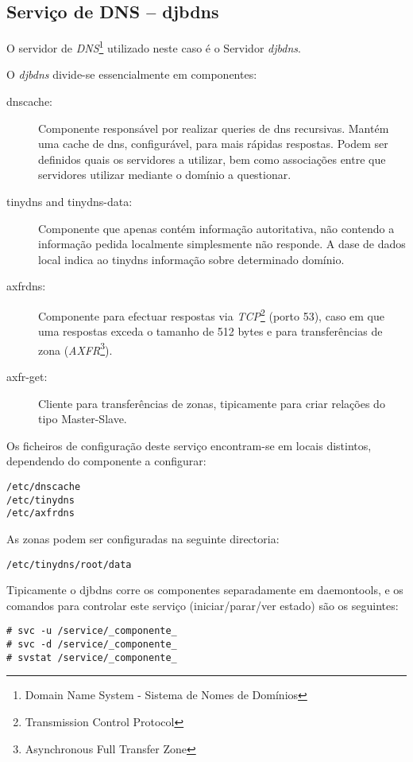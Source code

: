 \subsection{Serviço de DNS -- djbdns}

O servidor de \emph{DNS}\footnote{Domain Name System - Sistema de Nomes de Domínios} utilizado neste caso é o Servidor \emph{djbdns}.

O \emph{djbdns} divide-se essencialmente em componentes:
\begin{description}
	\item[dnscache:] Componente responsável por realizar queries de dns recursivas. Mantém uma cache de dns, configurável, para mais rápidas respostas. Podem ser definidos quais os servidores a utilizar, bem como associações entre que servidores utilizar mediante o domínio a questionar.
	\item[tinydns and tinydns-data:] Componente que apenas contém informação autoritativa, não contendo a informação pedida localmente simplesmente não responde. A dase de dados local indica ao tinydns informação sobre determinado domínio.
	\item[axfrdns:] Componente para efectuar respostas via \emph{TCP}\footnote{Transmission Control Protocol} (porto 53), caso em que uma respostas exceda o tamanho de 512 bytes e para transferências de zona (\emph{AXFR}\footnote{Asynchronous Full Transfer Zone}).
	\item[axfr-get:] Cliente para transferências de zonas, tipicamente para criar relações do tipo Master-Slave.
\end{description}

Os ficheiros de configuração deste serviço encontram-se em locais distintos, dependendo do componente a configurar:

\begin{Verbatim}[commandchars=\\\{\}]
/etc/dnscache
/etc/tinydns
/etc/axfrdns
\end{Verbatim}

As zonas podem ser configuradas na seguinte directoria:

\begin{Verbatim}[commandchars=\\\{\}]
/etc/tinydns/root/data
\end{Verbatim}

Tipicamente o djbdns corre os componentes separadamente em daemontools, e os comandos para controlar este serviço (iniciar/parar/ver estado) são os seguintes:

\begin{Verbatim}[commandchars=\\\{\}]
# svc -u /service/_componente_
# svc -d /service/_componente_
# svstat /service/_componente_
\end{Verbatim}

